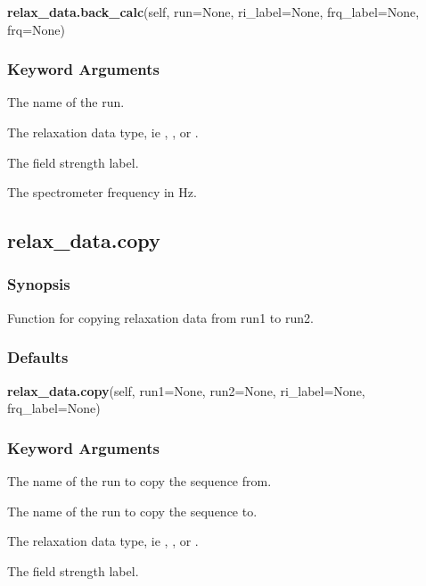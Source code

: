 \textsf{\textbf{relax\_data.back\_calc}(self, run=None, ri\_label=None, frq\_label=None, frq=None)}


\subsubsection{Keyword Arguments}

  The name of the run. 

  The relaxation data type, ie , , or . 

  The field strength label. 

  The spectrometer frequency in Hz. 





\newpage

\subsection{relax\_data.copy}


\subsubsection{Synopsis}

Function for copying relaxation data from run1 to run2.



\subsubsection{Defaults}

\textsf{\textbf{relax\_data.copy}(self, run1=None, run2=None, ri\_label=None, frq\_label=None)}


\subsubsection{Keyword Arguments}

  The name of the run to copy the sequence from. 

  The name of the run to copy the sequence to. 

  The relaxation data type, ie , , or . 

  The field strength label. 





